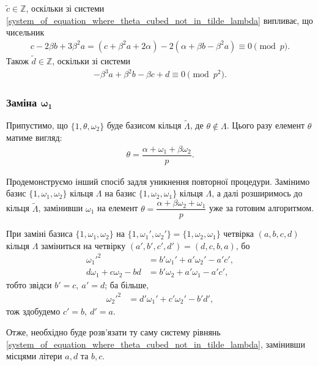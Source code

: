 \documentclass{thesis}
\begin{document}
\begin{remark} $\tilde{c} \in \mathbb{Z}$, оскільки зі системи \eqref{system_of_equation_where_theta_cubed_not_in_tilde_lambda} випливає, що чисельник
\begin{align*}
c - 2 \beta b + 3 \beta^2 a = (c + \beta^2 a + 2\alpha) - 2(\alpha + \beta b- \beta^2 a) \equiv 0 \pmod p.
\end{align*}
Також $\tilde{d} \in \mathbb{Z}$, оскільки зі системи
\begin{align*}
-\beta^3 a + \beta^2 b - \beta c + d \equiv 0 \pmod {p^2}.
\end{align*} 
\end{remark}

\subsubsection{Заміна $\boldsymbol{\omega_1}$} Припустимо, що $\{1,\theta,\omega_2\}$ буде базисом кільця $\tilde{\Lambda}$, де $\theta \notin \Lambda$. Цього разу елемент $\theta$ матиме вигляд:
\begin{align*}
\theta = \dfrac{\alpha + \omega_1 + \beta \omega_2}{p}.
\end{align*}

Продемонструємо інший спосіб задля уникнення повторної процедури. Замінимо базис $\{1,\omega_1,\omega_2\}$ кільця $\Lambda$ на базис $\{1,\omega_2,\omega_1\}$ кільця $\Lambda$, а далі розширимось до кільця $\tilde{\Lambda}$, замінивши $\omega_1$ на елемент $\theta = \dfrac{\alpha + \beta \omega_2 + \omega_1}{p}$ уже за готовим алгоритмом.

При заміні базиса $\{1,\omega_1,\omega_2\}$ на $\{1,\omega_1',\omega_2'\} = \{1,\omega_2,\omega_1\}$ четвірка $(a,b,c,d)$ кільця $\Lambda$ заміниться на четвірку $(a',b',c',d') = (d,c,b,a)$, бо
\begin{align*}
\omega_1'^2 & = b' \omega_1' + a' \omega_2' - a' c', \\
d \omega_1 + c \omega_2 - bd & = b' \omega_2 + a' \omega_1 - a' c',
\end{align*}
тобто звідси $b' = c,\ a' = d$; ба більше,
\begin{align*}
\omega_2'^2 & = d' \omega_1' + c' \omega_2' - b' d',
\end{align*}
тож здобудемо $c' = b,\ d' = a$.

Отже, необхідно буде розв'язати ту саму систему рівнянь \eqref{system_of_equation_where_theta_cubed_not_in_tilde_lambda}, замінивши місцями літери $a,d$ та $b,c$.
\end{document}

